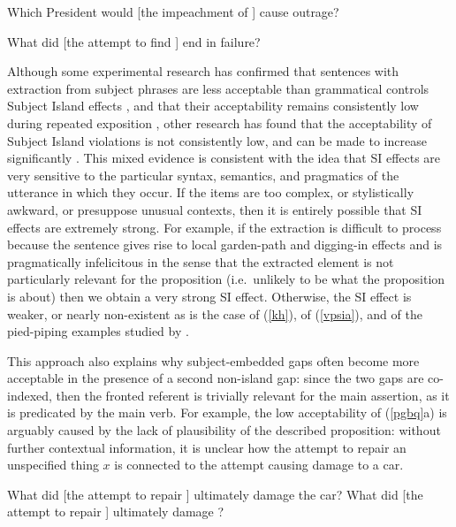 \documentclass[output=paper]{langsci/langscibook}
\begin{document}
\ea
\ea Which President would [the  impeachment of \spcs] cause  outrage? \\
\citep{chavesextr}

 \ex What did [the attempt to find \spcs]  end in failure?\\
 \citep[370]{hofsaglang}
 \z \label{kh}
 \z
 
Although some experimental research has confirmed that sentences with extraction from subject phrases are less acceptable than grammatical controls Subject Island effects \citep{sprsat2,goodall11,crawfordwccfl,clausencuny,greco}, and that their acceptability
remains consistently low during repeated exposition  \citep{sprsat2,crawfordwccfl}, other research has found that the acceptability of  Subject Island violations is not consistently low, and can be made to increase significantly \citep{hiramatsu00,clausencuny,chavesjeruen,chavessubjexp}. This mixed evidence is consistent with the idea that SI effects are very sensitive to the particular syntax, semantics, and pragmatics of the utterance in which they occur. If the items are too complex, or stylistically awkward, or presuppose unusual contexts, then it is entirely possible that 
SI effects are extremely strong.  For example, if the extraction is difficult to process because the sentence gives rise to local  garden-path and digging-in effects and is pragmatically infelicitous in the sense that the extracted element is not particularly relevant for the proposition (i.e.\ unlikely to be what the proposition is about) then we obtain a very strong SI effect. Otherwise, the SI effect is weaker, or nearly non-existent as is the case of (\ref{kh}), of (\ref{vpsia}),
and of the  pied-piping examples studied by \citet{annerels}.

This approach also explains why subject-embedded gaps often become more acceptable in the presence of a second non-island gap: since the two gaps are co-indexed, then the fronted referent is trivially relevant for the main assertion, as it is predicated by the main verb. For example, the low acceptability of (\ref{pgbq}a) is arguably caused  by the lack of   plausibility of the described proposition: without further contextual information, it is unclear how the attempt to repair  an unspecified thing $x$ is connected to the attempt causing  damage to a car. 


\ea 
\ea \bad{*}What did [the attempt to repair \spcs] ultimately damage the car?
\ex What did [the attempt to repair \spcs] ultimately damage \spc?\\
\citep{colinphillips}
\z \label{pgbq}
\z
\end{document}
